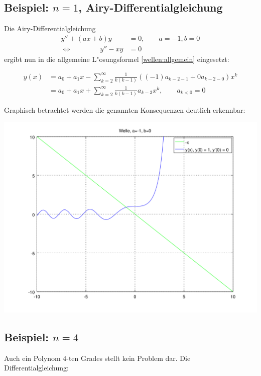 \subsection{Beispiel: $n = 1$, Airy-Differentialgleichung}
Die Airy-Differentialgleichung
\begin{align*}
	y''+(ax+b)y &= 0, \qquad a = -1, b = 0 \\
	\Leftrightarrow	\qquad \qquad y''-xy &= 0
\end{align*}
ergibt nun in die allgemeine L"osungsformel \ref{wellen:allgemein} eingesetzt:

\begin{equation*}
\begin{split}
	y(x) &= a_0+a_1x-\sum_{k=2}^{\infty} \frac{1}{k(k-1)} ((-1) a_{k-2-1} + 0 
	a_{k-2-0}) x^k
	\\
	&= a_0+a_1x+\sum_{k=2}^{\infty} \frac{1}{k(k-1)} a_{k-3} x^k,
	\qquad a_{k < 0} = 0
\end{split}
\end{equation*}

Graphisch betrachtet werden die genannten Konsequenzen deutlich erkennbar:

\begin{center}
	\includegraphics[scale=0.53]{./wellen/images/allgemein/n1.png}
\end{center}

\subsection{Beispiel: $n = 4$}

Auch ein Polynom 4-ten Grades stellt kein Problem dar. Die 
Differentialgleichung:

